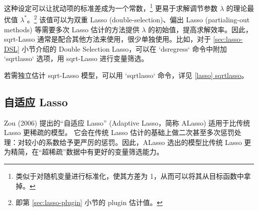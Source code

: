 这种设定可以让扰动项的标准差成为一个常数，\footnote{%
  类似于对随机变量进行标准化，使其方差为 1，从而可以将其从目标函数中拿掉。}
更易于求解调节参数 $\lambda$ 的理论最优值 $\lambda^*$。\footnote{%
      即第 \ref{sec:lasso-plugin} 小节的 plugin 估计值。}
该值可以为双重 Lasso (double-selection)、偏出 Lasso (partialing-out methods) 等需要多次 Lasso 估计的方法提供 $\lambda$ 的初始值，提高求解效率。因此，sqrt-Lasso 通常是配合其他方法来使用，很少单独使用。比如，对于 \ref{sec:lasso-DSL} 小节介绍的 Double Selection Lasso，可以在 `dsregress` 命令中附加 `sqrtlasso` 选项，用 sqrt-Lasso 进行变量筛选。

若需独立估计 sqrt-Lasso 模型，可以用 `sqrtlasso` 命令，详见 \href{https://www.stata.com/manuals/lassosqrtlasso.pdf}{[lasso] sqrtlasso}。


%






\subsection{自适应 Lasso}\label{sec:adaptive-lasso}

Zou (2006) 提出的“自适应 Lasso” (Adaptive Lasso，简称 ALasso) 适用于比传统 Lasso 更稀疏的模型。%
它会在传统 Lasso 估计的基础上做二次甚至多次惩罚处理：对较小的系数给予更严厉的惩罚。因此，ALasso 选出的模型比传统 Lasso 更为精简，在“超稀疏”数据中有更好的变量筛选能力。

